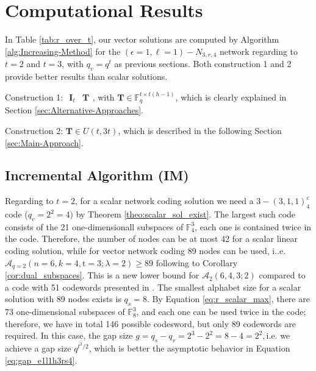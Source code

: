 \chapter{Computational Results} \label{chap:comp_method}

In Table \ref{tab:r_over_t}, our vector solutions are computed by
Algorithm \ref{alg:Increasing-Method} for the $\left(\epsilon=1,\ell=1\right)-\ensuremath{N}_{3,r,4}$
network regarding to $t=2$ and $t=3$, with $q_{v}=q^{t}$ as previous
sections. Both construction 1 and 2 provide better results than scalar
solutions. 

Construction 1: $\begin{array}{c|c}
\boldsymbol{I}_{t} & \boldsymbol{T}\end{array}$, with $\boldsymbol{T}\in\ensuremath{\mathbb{F}}_{q}^{t\times t\left(h-1\right)}$,
which is clearly explained in Section \ref{sec:Alternative-Approaches}.

Construction 2: $\boldsymbol{T}\in U\left(t,3t\right)$, which is
described in the following Section \ref{sec:Main-Approach}.

\section{Incremental Algorithm (IM) \label{sec:Main-Approach}}

Regarding to $t=2$, for a scalar network coding solution we need
a $3-\left(3,1,1\right)_{4}^{c}$ code ($q_{v}=2^{2}=4)$ by Theorem
\ref{theo:scalar_sol_exist}. The largest such code consists of the
21 one-dimensionall subspaces of $\ensuremath{\mathbb{F}}_{4}^{3}$,
each one is contained twice in the code. Therefore, the number of
nodes can be at most 42 for a scalar linear coding solution, while
for vector network coding 89 nodes can be used, i..e. $\mathcal{A}_{q=2}\left(n=6,k=4,\mathrm{t}=3;\lambda=2\right)\geq89$
following to Corollary \ref{cor:dual_subspaces}. This is a new lower
bound for $\mathcal{A}_{2}\left(6,4,3;2\right)$ compared to a code
with 51 codewords presented in \cite{Wachter-Zeh:2018}. The smallest
alphabet size for a scalar solution with 89 nodes exists is $q_{s}=8$.
By Equation \ref{eq:r_scalar_max}, there are 73 one-dimensional subspaces
of $\ensuremath{\mathbb{F}}_{8}^{3}$, and each one can be used twice
in the code; therefore, we have in total 146 possible codesword, but
only 89 codewords are required. In this case, the gap size $g=q_{s}-q_{v}=2^{3}-2^{2}=8-4=2^{2},$i.e.
we achieve a gap size $q^{t^{2}/2}$, which is better the asymptotic
behavior in Equation \ref{eq:gap_e1l1h3rs4}. 

